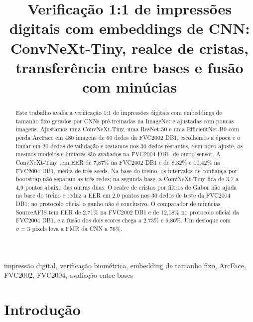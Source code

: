 \documentclass[conference]{IEEEtran}
\begin{document}
\title{Verificação 1:1 de impressões digitais com embeddings de CNN: ConvNeXt-Tiny, realce de cristas, transferência entre bases e fusão com minúcias}

\author{%
}

\maketitle

\begin{abstract}
Este trabalho avalia a verificação 1:1 de impressões digitais com embeddings de tamanho fixo gerados por CNNs pré-treinadas na ImageNet e ajustadas com poucas imagens. Ajustamos uma ConvNeXt-Tiny, uma ResNet-50 e uma EfficientNet-B0 com perda ArcFace em 480 imagens de 60 dedos da FVC2002 DB1, escolhemos a época e o limiar em 20 dedos de validação e testamos nos 30 dedos restantes. Sem novo ajuste, os mesmos modelos e limiares são avaliados na FVC2004 DB1, de outro sensor. A ConvNeXt-Tiny tem EER de 7,87\% na FVC2002 DB1 e de 8,32\% e 10,42\% na FVC2004 DB1, média de três seeds. Na base do treino, os intervalos de confiança por bootstrap não separam as três redes; na segunda base, a ConvNeXt-Tiny fica de 3,7 a 4,9 pontos abaixo das outras duas. O realce de cristas por filtros de Gabor não ajuda na base do treino e reduz a EER em 2,0 pontos nos 30 dedos de teste da FVC2004 DB1; no protocolo oficial o ganho não é conclusivo. O comparador de minúcias SourceAFIS tem EER de 2,71\% na FVC2002 DB1 e de 12,18\% no protocolo oficial da FVC2004 DB1, e a fusão dos dois scores chega a 2,73\% e 6,86\%. Um desfoque com $\sigma=3$ pixels leva a FMR da CNN a 76\%.
\end{abstract}

\begin{IEEEkeywords}
impressão digital, verificação biométrica, embedding de tamanho fixo, ArcFace, FVC2002, FVC2004, avaliação entre bases
\end{IEEEkeywords}

\section{Introdução}
\label{sec:intro}
\end{document}
